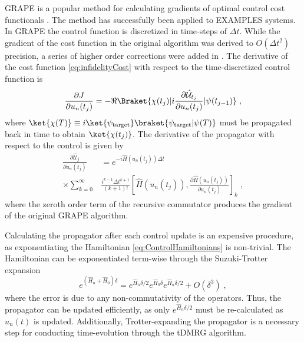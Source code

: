 GRAPE is a popular method for calculating gradients of optimal control cost functionals . The method has successfully been applied to EXAMPLES systems. In GRAPE the control function is discretized in time-steps of  $\Delta t$. While the gradient of the cost function in the original algorithm was derived to $O(\Delta t ^2)$ precision, a series of higher order corrections were added in \cite{de2011second}. The derivative of the cost function \eqref{eq:infidelityCost} with respect to the time-discretized control function is
\begin{equation}
	\frac{\partial J}{\partial u_n (t_j)}  = - \Re \Braket{\chi (t_j) | i  \frac{\partial \hat{\mathcal{U}}_{t_j}}{\partial u_n (t_j)} | \psi (t_{j-1})} \; , \label{eq:CostDeriv}
\end{equation}
where $\ket{\chi (T)} \equiv i \ket{\psi_{\mathrm{target}}} \braket{\psi_{\mathrm{target}} | \psi (T)}$ must be propagated back in time to obtain $\ket{\chi (t_j)}$.
The derivative of the propagator with respect to the control is given by
\begin{align}
	\frac{\partial \hat{\mathcal{U}}_{j}}{\partial u_n (t_j)} &= e^{-i \hat{H} (u_n (t_j)) \Delta t} \nonumber \\ 
	 \times \sum_{k = 0}^{\infty } &  \frac{i^{k-1} \Delta t^{k+1}}{(k+1)!} \left[ \hat{H} (u_n (t_j)) , \frac{\partial \hat{H} (u_n (t_j))}{\partial u_n (t_j)}  \right]_k \; , \label{eq:PropDeriv}
\end{align}
where the zeroth order term of the recursive commutator produces the gradient of the original GRAPE algorithm.

Calculating the propagator after each control update is an expensive procedure, as exponentiating the Hamiltonian \eqref{eq:ControlHamiltonians} is non-trivial. The Hamiltonian can be exponentiated term-wise through the Suzuki-Trotter expansion
\begin{equation}
		e ^{( \hat{H}_n + \hat{H}_0  ) \delta } = e^{  \hat{H}_n \delta /2  } e^{ \hat{H}_0 \delta } e^{ \hat{H}_n \delta /2 } + O(\delta^3) \; , \label{eq:SuzukiTrotter}
\end{equation}
where the error is due to any non-commutativity of the operators.
Thus, the propagator can be updated efficiently, as only $e^{ \hat{H}_n \delta /2 }$ must be re-calculated as $u_n (t)$ is updated. Additionally, Trotter-expanding the propagator is a necessary step for conducting time-evolution through the tDMRG algorithm. 

